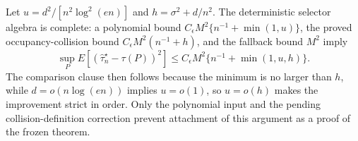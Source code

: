 Let \(u=d^2/[n^2\log^2(en)]\) and \(h=\sigma^2+d/n^2\).  The deterministic selector algebra is complete: a polynomial bound \(C_{\epsilon}M^2\{n^{-1}+\min(1,u)\}\), the proved occupancy-collision bound \(C_{\epsilon}M^2(n^{-1}+h)\), and the fallback bound \(M^2\) imply
\[
 \sup_P E[(\widehat\tau_n^{\star}-\tau(P))^2]
 \le C_{\epsilon}M^2\{n^{-1}+\min(1,u,h)\}.
\]
The comparison clause then follows because the minimum is no larger than \(h\), while \(d=o(n\log(en))\) implies \(u=o(1)\), so \(u=o(h)\) makes the improvement strict in order.  Only the polynomial input and the pending collision-definition correction prevent attachment of this argument as a proof of the frozen theorem.
